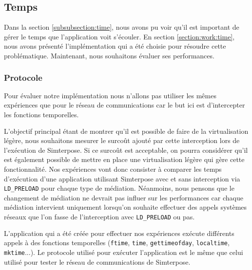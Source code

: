 \subsection{Temps}
\label{section:temps}

Dans la section \ref{subsubsection:time}, nous avons pu voir qu'il est important de gérer le temps que l'application voit s'écouler. En section \ref{section:work:time}, nous avons présenté l'implémentation qui a été choisie pour résoudre cette problématique. Maintenant, nous souhaitons évaluer ses performances.

\subsubsection{Protocole}
Pour évaluer notre implémentation nous n'allons pas utiliser les mêmes expériences que pour le réseau de communications car le but ici est d'intercepter les fonctions temporelles.

L'objectif principal étant de montrer qu'il est possible de faire de la virtualisation légère, nous souhaitons mesurer le surcoût ajouté par cette interception lors de l'exécution de Simterpose. Si ce surcoût est acceptable, on pourra considérer qu'il est également possible de mettre en place une virtualisation légère qui gère cette fonctionnalité. Nos expériences vont donc consister à comparer les temps d'exécution d'une application utilisant Simterpose avec et sans interception via \texttt{LD\_PRELOAD} pour chaque type de médiation. Néanmoins, nous pensons que le changement de médiation ne devrait pas influer sur les performances car chaque médiation intervient uniquement lorsqu'on souhaite effectuer des appels systèmes réseaux que l'on fasse de l'interception avec \texttt{LD\_PRELOAD} ou pas.

L'application qui a été créée pour effectuer nos expériences exécute différents appels à des fonctions temporelles (\texttt{ftime}, \texttt{time}, \texttt{gettimeofday}, \texttt{localtime}, \texttt{mktime}...). Le protocole utilisé pour exécuter l'application est le même que celui utilisé pour tester le réseau de communications de Simterpose.

